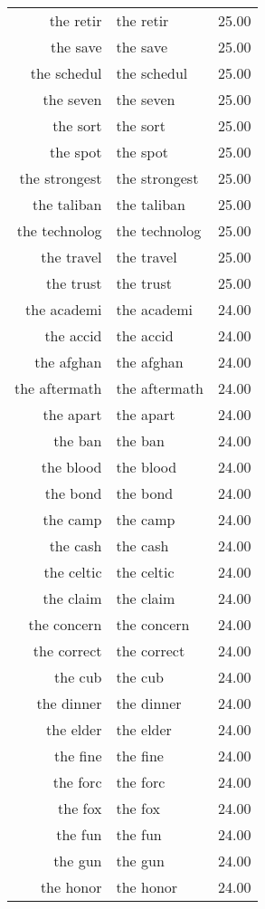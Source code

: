 \begin{table}[ht]
\begin{tabular}{rlr}
  the retir & the retir & 25.00 \\ 
  the save & the save & 25.00 \\ 
  the schedul & the schedul & 25.00 \\ 
  the seven & the seven & 25.00 \\ 
  the sort & the sort & 25.00 \\ 
  the spot & the spot & 25.00 \\ 
  the strongest & the strongest & 25.00 \\ 
  the taliban & the taliban & 25.00 \\ 
  the technolog & the technolog & 25.00 \\ 
  the travel & the travel & 25.00 \\ 
  the trust & the trust & 25.00 \\ 
  the academi & the academi & 24.00 \\ 
  the accid & the accid & 24.00 \\ 
  the afghan & the afghan & 24.00 \\ 
  the aftermath & the aftermath & 24.00 \\ 
  the apart & the apart & 24.00 \\ 
  the ban & the ban & 24.00 \\ 
  the blood & the blood & 24.00 \\ 
  the bond & the bond & 24.00 \\ 
  the camp & the camp & 24.00 \\ 
  the cash & the cash & 24.00 \\ 
  the celtic & the celtic & 24.00 \\ 
  the claim & the claim & 24.00 \\ 
  the concern & the concern & 24.00 \\ 
  the correct & the correct & 24.00 \\ 
  the cub & the cub & 24.00 \\ 
  the dinner & the dinner & 24.00 \\ 
  the elder & the elder & 24.00 \\ 
  the fine & the fine & 24.00 \\ 
  the forc & the forc & 24.00 \\ 
  the fox & the fox & 24.00 \\ 
  the fun & the fun & 24.00 \\ 
  the gun & the gun & 24.00 \\ 
  the honor & the honor & 24.00 \\ 

\end{tabular}
\end{table}

